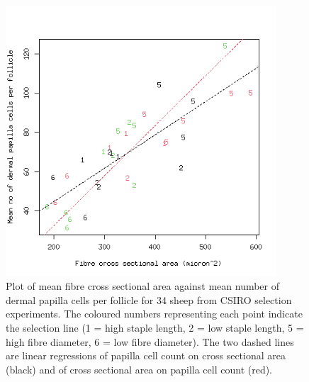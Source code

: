 %

\begin{figure}[!h]
  \centering
   \includegraphics[width=0.9\textwidth]{dpcca.png}
  \caption{Plot of mean fibre cross sectional area against mean number of dermal papilla cells per follicle for 34 sheep from CSIRO selection experiments. The coloured numbers representing each point indicate the selection line (1 = high staple length, 2 = low staple length, 5 = high fibre diameter, 6 = low fibre diameter). The two dashed lines are   linear regressions of papilla cell count on cross sectional area (black) and of cross sectional area on papilla cell count (red).}
  \label{fig:dpca}
\end{figure}

%

